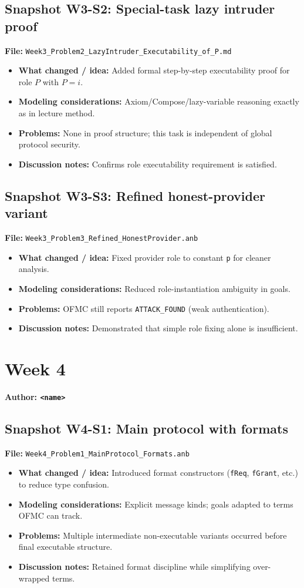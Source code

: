 \documentclass[11pt,a4paper]{article}
\begin{document}
\subsection*{Snapshot W3-S2: Special-task lazy intruder proof}
\textbf{File:} \texttt{Week3\_Problem2\_LazyIntruder\_Executability\_of\_P.md}
\begin{itemize}[leftmargin=1.2em]
  \item \textbf{What changed / idea:} Added formal step-by-step executability proof for role $P$ with $P=i$.
  \item \textbf{Modeling considerations:} Axiom/Compose/lazy-variable reasoning exactly as in lecture method.
  \item \textbf{Problems:} None in proof structure; this task is independent of global protocol security.
  \item \textbf{Discussion notes:} Confirms role executability requirement is satisfied.
\end{itemize}

\subsection*{Snapshot W3-S3: Refined honest-provider variant}
\textbf{File:} \texttt{Week3\_Problem3\_Refined\_HonestProvider.anb}
\begin{itemize}[leftmargin=1.2em]
  \item \textbf{What changed / idea:} Fixed provider role to constant \texttt{p} for cleaner analysis.
  \item \textbf{Modeling considerations:} Reduced role-instantiation ambiguity in goals.
  \item \textbf{Problems:} OFMC still reports \texttt{ATTACK\_FOUND} (weak authentication).
  \item \textbf{Discussion notes:} Demonstrated that simple role fixing alone is insufficient.
\end{itemize}

\section{Week 4}
\textbf{Author: \texttt{<name>}}

\subsection*{Snapshot W4-S1: Main protocol with formats}
\textbf{File:} \texttt{Week4\_Problem1\_MainProtocol\_Formats.anb}
\begin{itemize}[leftmargin=1.2em]
  \item \textbf{What changed / idea:} Introduced format constructors (\texttt{fReq}, \texttt{fGrant}, etc.) to reduce type confusion.
  \item \textbf{Modeling considerations:} Explicit message kinds; goals adapted to terms OFMC can track.
  \item \textbf{Problems:} Multiple intermediate non-executable variants occurred before final executable structure.
  \item \textbf{Discussion notes:} Retained format discipline while simplifying over-wrapped terms.
\end{itemize}
\end{document}

